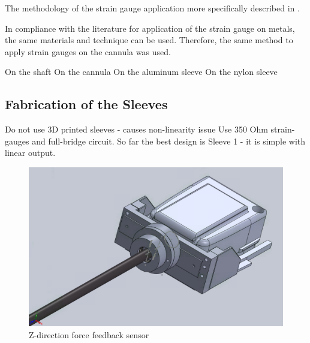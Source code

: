 	The methodology of the strain gauge application more specifically described in \cite{StrGugeInst}.

	In compliance with the literature \cite{StrGugeInst} for application of the strain gauge on metals, the same materials and technique can be used. Therefore, the same method to apply strain gauges on the cannula was used.

	On the shaft
	On the cannula
	On the aluminum sleeve
	On the nylon sleeve

	\subsection{Fabrication of the Sleeves}
	\label{sec:sleevesFabr}

	Do not use 3D printed sleeves - causes non-linearity issue
	Use 350 Ohm strain-gauges and full-bridge circuit.
	So far the best design is Sleeve 1 - it is simple with linear output.

		\begin{figure}
			\begin{center}
			\includegraphics[width=120mm]{fig/methods/z_dir.png}
			\end{center}
			\vspace{-4mm}
		\caption[Z-direction force feedback sensor]
		{Z-direction force feedback sensor}
		\label{fig:Z-direction}
		\vspace{-2mm}
		\end{figure}

